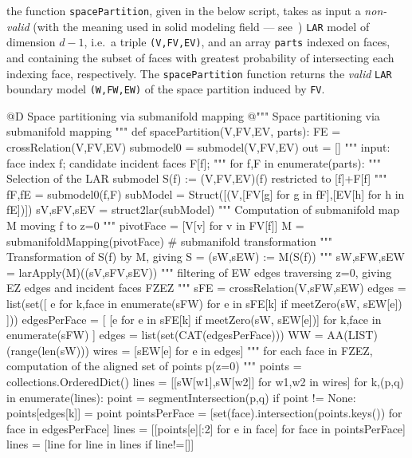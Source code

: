 \documentclass[11pt,oneside]{article}    %
\begin{document}
the function \texttt{spacePartition}, given in the below script, takes as input a \emph{non-valid} (with the meaning used in solid modeling field --- see~\cite{Requicha:1980:RRS:356827.356833}) \texttt{LAR} model of dimension $d-1$, i.e.~a triple \texttt{(V,FV,EV)}, and an array \texttt{parts} indexed on faces, and containing the subset of faces with greatest probability of intersecting each indexing face, respectively. The \texttt{spacePartition} function returns the \emph{valid} \texttt{LAR} boundary model \texttt{(W,FW,EW)} of the space partition induced by \texttt{FV}.
 
@D Space partitioning via submanifold mapping
@{""" Space partitioning via submanifold mapping """
def spacePartition(V,FV,EV, parts):
    FE = crossRelation(V,FV,EV)
    submodel0 = submodel(V,FV,EV)
    out = []
    """ input: face index f; candidate incident faces F[f]; """
    for f,F in enumerate(parts):
        """ Selection of the LAR submodel S(f) := (V,FV,EV)(f) restricted to [f]+F[f] """    
        fF,fE = submodel0(f,F)
        subModel = Struct([(V,[FV[g] for g in fF],[EV[h] for h in fE])])
        sV,sFV,sEV = struct2lar(subModel)
        """ Computation of submanifold map M moving f to z=0 """
        pivotFace = [V[v] for v in FV[f]]
        M = submanifoldMapping(pivotFace)  # submanifold transformation
        """ Transformation of S(f) by M, giving S = (sW,sEW) := M(S(f)) """
        sW,sFW,sEW = larApply(M)((sV,sFV,sEV))
        """ filtering of EW edges traversing z=0, giving EZ edges and incident faces FZEZ """
        sFE = crossRelation(V,sFW,sEW)    
        edges = list(set([ e for k,face in enumerate(sFW)  for e in sFE[k] 
                    if meetZero(sW, sEW[e]) ]))
        edgesPerFace = [ [e for e in sFE[k] if meetZero(sW, sEW[e])] 
                    for k,face in enumerate(sFW) ]
        edges = list(set(CAT(edgesPerFace)))
        WW = AA(LIST)(range(len(sW)))
        wires = [sEW[e] for e in edges]
        """ for each face in FZEZ, computation of the aligned set of points p(z=0) """
        points = collections.OrderedDict()
        lines = [[sW[w1],sW[w2]] for w1,w2 in wires]
        for k,(p,q) in enumerate(lines): 
            point = segmentIntersection(p,q)
            if point != None: points[edges[k]] = point
        pointsPerFace = [set(face).intersection(points.keys()) for face in edgesPerFace]
        lines = [[points[e][:2] for e in face] for face in pointsPerFace]
        lines = [line for line in lines if line!=[]]
}
\end{document}
